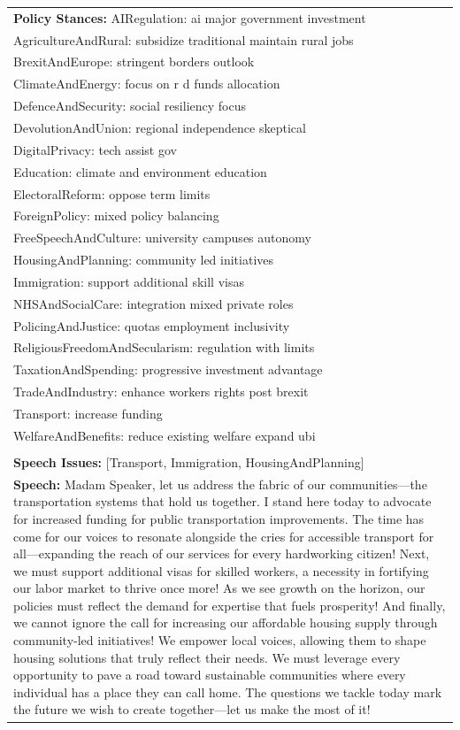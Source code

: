 \documentclass[11pt]{article}
\begin{document}
\begin{table}[ht]
\begin{tabularx}{\textwidth}{X}
\textbf{Policy Stances:} 
AIRegulation: ai major government investment \\
AgricultureAndRural: subsidize traditional maintain rural jobs \\
BrexitAndEurope: stringent borders outlook \\
ClimateAndEnergy: focus on r d funds allocation \\
DefenceAndSecurity: social resiliency focus \\
DevolutionAndUnion: regional independence skeptical \\
DigitalPrivacy: tech assist gov \\
Education: climate and environment education \\
ElectoralReform: oppose term limits \\
ForeignPolicy: mixed policy balancing \\
FreeSpeechAndCulture: university campuses autonomy \\
HousingAndPlanning: community led initiatives \\
Immigration: support additional skill visas \\
NHSAndSocialCare: integration mixed private roles \\
PolicingAndJustice: quotas employment inclusivity \\
ReligiousFreedomAndSecularism: regulation with limits \\
TaxationAndSpending: progressive investment advantage \\
TradeAndIndustry: enhance workers rights post brexit \\
Transport: increase funding \\
WelfareAndBenefits: reduce existing welfare expand ubi \\
\\[4pt]

\textbf{Speech Issues:} [Transport, Immigration, HousingAndPlanning] \\[4pt]

\textbf{Speech:} Madam Speaker, let us address the fabric of our communities—the transportation systems that hold us together. I stand here today to advocate for increased funding for public transportation improvements. The time has come for our voices to resonate alongside the cries for accessible transport for all—expanding the reach of our services for every hardworking citizen! Next, we must support additional visas for skilled workers, a necessity in fortifying our labor market to thrive once more! As we see growth on the horizon, our policies must reflect the demand for expertise that fuels prosperity! And finally, we cannot ignore the call for increasing our affordable housing supply through community-led initiatives! We empower local voices, allowing them to shape housing solutions that truly reflect their needs. We must leverage every opportunity to pave a road toward sustainable communities where every individual has a place they can call home. The questions we tackle today mark the future we wish to create together—let us make the most of it! \\[4pt]


\end{tabularx}
\end{table}
\end{document}
